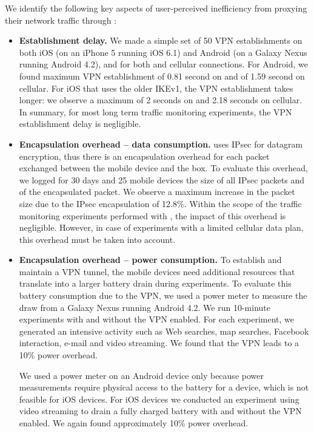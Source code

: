 We identify the following key aspects of user-perceived inefficiency from 
proxying their network traffic through \platname{}: 
\begin{itemize}
\item \textbf{Establishment delay.} We made a simple set of 50 VPN establishments on both iOS (on an
iPhone 5 running iOS 6.1) and Android (on a Galaxy Nexus running
Android 4.2), and for both \wifi{} and cellular connections. For
Android, we found maximum VPN establishment of 0.81 second on \wifi{}
and of 1.59 second on cellular. For iOS that uses the older IKEv1, the
VPN establishment takes longer: we observe a maximum of 2 seconds on
\wifi{} and 2.18 seconds on cellular.  In summary, for most long term
traffic monitoring experiments, the VPN establishment delay is
negligible. 
\item \textbf{Encapsulation overhead -- data consumption.} \platname{} uses IPsec for datagram encryption, thus there is
an encapsulation overhead for each packet exchanged between the mobile
device and the \platname{} box. To evaluate this overhead, we logged
for 30 days and 25 mobile devices the size of all IPsec packets and of
the encapsulated packet. We observe a maximum increase in the packet
size due to the IPsec encapsulation of 12.8\%. Within the scope of the
traffic monitoring experiments performed with \platname{}, the impact
of this overhead is negligible. However, in case of experiments with a
limited cellular data plan, this overhead must be taken into account.

\item \textbf{Encapsulation overhead -- power consumption.}
To establish and maintain a VPN tunnel, the mobile devices need
additional resources that translate into a larger battery drain during
experiments. To evaluate this battery consumption due to the VPN, we
used a power meter to measure the draw from a Galaxy Nexus running
Android 4.2. We run 10-minute experiments with and without the VPN
enabled. For each experiment, we generated an intensive activity such
as Web searches, map searches, Facebook interaction, e-mail and video
streaming. We found that the VPN leads to a 10\% power overhead. 

We used a power meter on an Android device only because power
measurements require physical access to the battery for a device,
which is not feasible for iOS devices. For iOS devices we conducted
an experiment using video streaming to drain a fully charged battery with 
and without the VPN enabled. We again found approximately 10\% power overhead. 


\end{itemize}
